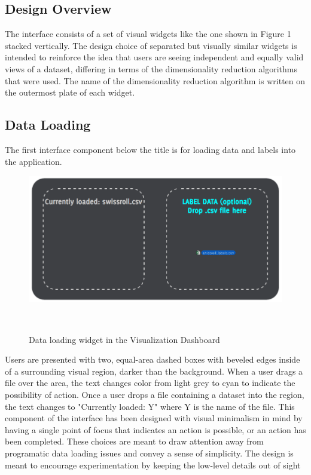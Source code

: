 \documentclass{sigchi}
\begin{document}
\subsection{Design Overview}
The interface consists of a set of visual widgets like the one shown in Figure 1 stacked vertically. %
%
The design choice of separated but visually similar widgets is intended to reinforce the idea that users are seeing independent and equally valid views of a dataset, differing in terms of the dimensionality reduction algorithms that were used. %
%
The name of the dimensionality reduction algorithm is written on the outermost plate of each widget. %
%
\subsection{Data Loading}
The first interface component below the title is for loading data and labels into the application. %
%
\begin{figure}
  \centering
  \includegraphics[width=.99\columnwidth]{figures/data_load}
  \caption{Data loading widget in the Visualization Dashboard}~\label{fig:figure2}
\end{figure}
%
Users are presented with two, equal-area dashed boxes with beveled edges inside of a surrounding visual region, darker than the background. %
%
When a user drags a file over the area, the text changes color from light grey to cyan to indicate the possibility of action. %
%
Once a user drops a file containing a dataset into the region, the text changes to "Currently loaded: Y" where Y is the name of the file. %
%
This component of the interface has been designed with visual minimalism in mind by having a single point of focus that indicates an action is possible, or an action has been completed. %
%
These choices are meant to draw attention away from programatic data loading issues and convey a sense of simplicity. %
%
The design is meant to encourage experimentation by keeping the low-level details out of sight%
\end{document}
